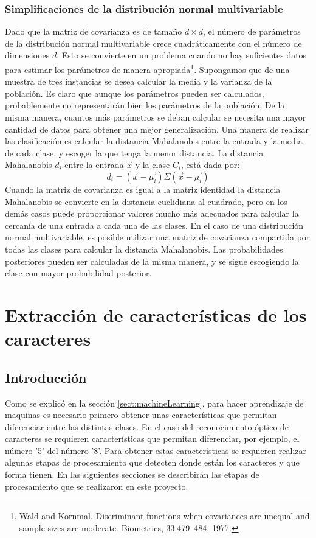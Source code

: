 \documentclass[a4paper, 11pt, oneside]{report}
\begin{document}
\subsection{Simplificaciones de la distribución normal multivariable}
Dado que la matriz de covarianza es de tamaño $d \times d$, el número de parámetros de la distribución normal multivariable crece cuadráticamente con el número de dimensiones $d$. Esto se convierte en un problema cuando no hay suficientes datos para estimar los parámetros de manera apropiada\footnote{Wald and Kornmal. Discriminant functions when covariances are unequal and sample sizes are moderate. Biometrics, 33:479–484, 1977.}. Supongamos que de una muestra de tres instancias se desea calcular la media y la varianza de la población. Es claro que aunque los parámetros pueden ser calculados, probablemente no representarán bien los parámetros de la población. De la misma manera, cuantos más parámetros se deban calcular se necesita una mayor cantidad de datos para obtener una mejor generalización.
Una manera de realizar las clasificación es calcular la distancia Mahalanobis entre la entrada y la media de cada clase, y escoger la que tenga la menor distancia. La distancia Mahalanobis $d_i$ entre la entrada $\vec{x}$ y la clase $C_i$, está dada por:
\begin{equation}
\label{eq:mahalanobis}
d_i = (\vec{x}-\vec{\mu_i})\Sigma(\vec{x}-\vec{\mu_i}) 
\end{equation}
Cuando la matriz de covarianza es igual a la matriz identidad la distancia Mahalanobis se convierte en la distancia euclidiana al cuadrado, pero en los demás casos puede proporcionar valores mucho más adecuados para calcular la cercanía de una entrada a cada una de las clases. En el caso de una distribución normal multivariable, es posible utilizar una matriz de covarianza compartida por todas las clases para calcular la distancia Mahalanobis. Las probabilidades posteriores pueden ser calculadas de la misma manera, y se sigue escogiendo la clase con mayor probabilidad posterior.
\chapter{Extracción de características de los caracteres}
\label{chap:features}
\section{Introducción}
Como se explicó en la sección \ref{sect:machineLearning}, para hacer aprendizaje de maquinas es necesario primero obtener unas características que permitan diferenciar entre las distintas clases. En el caso del reconocimiento óptico de caracteres se requieren características que permitan diferenciar, por ejemplo, el número '5' del número '8'. Para obtener estas características se requieren realizar algunas etapas de procesamiento que detecten donde están los caracteres y que forma tienen. En las siguientes secciones se describirán las etapas de procesamiento que se realizaron en este proyecto.
\end{document}
